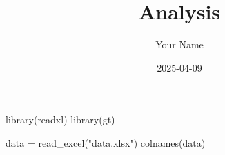 \documentclass[
  letterpaper,
  DIV=11,
  numbers=noendperiod]{scrartcl}
\title{Analysis}
\author{Your Name}
\date{2025-04-09}
\newenvironment{Shaded}{\begin{snugshade}}{\end{snugshade}}
\newcommand{\FunctionTok}[1]{\textcolor[rgb]{0.28,0.35,0.67}{#1}}
\newcommand{\NormalTok}[1]{\textcolor[rgb]{0.00,0.23,0.31}{#1}}
\newcommand{\OtherTok}[1]{\textcolor[rgb]{0.00,0.23,0.31}{#1}}
\newcommand{\StringTok}[1]{\textcolor[rgb]{0.13,0.47,0.30}{#1}}
\renewcommand*\contentsname{Table of contents}
\newcommand\contentsname{Table of contents}
\begin{document}
\maketitle

\renewcommand*\contentsname{Table of contents}
{
\hypersetup{linkcolor=}
\setcounter{tocdepth}{3}
\tableofcontents
}

\begin{Shaded}
\begin{Highlighting}[]
\FunctionTok{library}\NormalTok{(readxl)}
\FunctionTok{library}\NormalTok{(gt)}

\NormalTok{data }\OtherTok{=} \FunctionTok{read\_excel}\NormalTok{(}\StringTok{"data.xlsx"}\NormalTok{)}
\FunctionTok{colnames}\NormalTok{(data)}
\end{Highlighting}
\end{Shaded}
\end{document}
